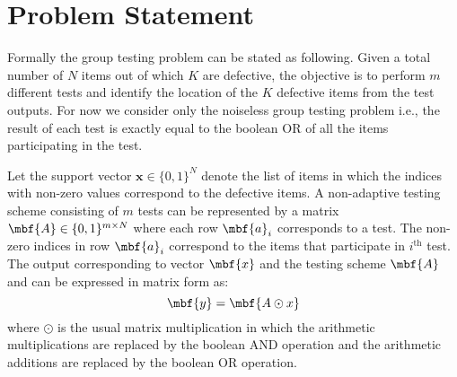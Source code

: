\documentclass[conference,,twocolumn]{IEEEtran}
\begin{document}

\section{Problem Statement}
Formally the group testing problem can be stated as following. Given a total number of $N$ items out of which $K$ are defective, the objective is to perform $m$ different tests and identify the location of the $K$ defective items from the test outputs. For now we consider only the noiseless group testing problem i.e., the result of each test is exactly equal to the boolean OR of all the items participating in the test. 

Let the support vector $\mathbf{x}\in\{0,1\}^{N}$ denote the list of items in which the indices with non-zero values correspond to the defective items. A non-adaptive testing scheme consisting of $m$ tests can be represented by a matrix $\mbf{A}\in\{0,1\}^{m\times N}$ where each row $\mbf{a}_{i}$ corresponds to a test. The non-zero indices in row $\mbf{a}_i$ correspond to the items that participate in $i^{\text{th}}$ test. The output corresponding to vector $\mbf{x}$ and the testing scheme $\mbf{A}$ and can be expressed in matrix form as:
\begin{equation*}
\mbf{y}=\mbf{A\odot x}
\end{equation*}
where $\odot$ is the usual matrix multiplication in which the arithmetic multiplications are replaced by the boolean AND operation and the arithmetic additions are replaced by the boolean OR operation.
\end{document}
